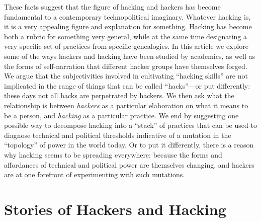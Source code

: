 \documentclass[10pt,letter,oneside]{scrartcl}
\begin{document}
These facts suggest that the figure of hacking and hackers has become
fundamental to a contemporary technopolitical imaginary.  Whatever hacking is,
it is a very appealing figure and explanation for something.  Hacking has become
both a rubric for something very general, while at the same time designating a
very specific set of practices from specific genealogies.  In this article we
explore some of the ways hackers and hacking have been studied by academics, as
well as the forms of self-narration that different hacker groups have themselves
forged.  We argue that the subjectivities involved in cultivating ``hacking
skills'' are not implicated in the range of things that can be called
``hacks''---or put differently: these days not all hacks are perpetrated by
hackers.  We then ask what the relationship is between \emph{hackers} as a
particular elaboration on what it means to be a person, and \emph{hacking} as a
particular practice.  We end by suggesting one possible way to decompose hacking
into a ``stack'' of practices that can be used to diagnose technical and
political thresholds indicative of a mutation in the ``topology'' of power in
the world today.  Or to put it differently, there is a reason why hacking seems
to be spreading everywhere: because the forms and affordances of technical and
political power are themselves changing, and hackers are at one forefront of
experimenting with such mutations.

\section*{Stories of Hackers and Hacking}
\end{document}
